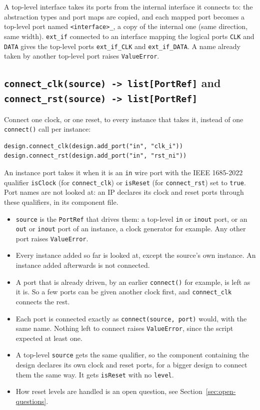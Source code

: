 \documentclass[11pt]{article}
\newcommand{\code}[1]{\texttt{#1}}
\begin{document}
A top-level interface takes its ports from the internal interface it connects to: the
abstraction types and port maps are copied, and each mapped port becomes a top-level port
named \code{<interface>\_<logical port>}, a copy of the internal one (same direction, same
width). \code{ext\_if} connected to an interface mapping the logical ports \code{CLK} and
\code{DATA} gives the top-level ports \code{ext\_if\_CLK} and \code{ext\_if\_DATA}. A name
already taken by another top-level port raises \code{ValueError}.

\subsection{\texttt{connect\_clk(source) -> list[PortRef]} and \texttt{connect\_rst(source) -> list[PortRef]}}

Connect one clock, or one reset, to every instance that takes it, instead of one
\code{connect()} call per instance:

\begin{lstlisting}[style=pyblock]
design.connect_clk(design.add_port("in", "clk_i"))
design.connect_rst(design.add_port("in", "rst_ni"))
\end{lstlisting}

An instance port takes it when it is an \code{in} wire port with the IEEE 1685-2022
qualifier \code{isClock} (for \code{connect\_clk}) or \code{isReset} (for
\code{connect\_rst}) set to \code{true}. Port names are not looked at: an IP declares its
clock and reset ports through these qualifiers, in its component file.

\begin{itemize}
    \item \code{source} is the \code{PortRef} that drives them: a top-level \code{in} or
    \code{inout} port, or an \code{out} or \code{inout} port of an instance, a clock
    generator for example. Any other port raises \code{ValueError}.
    \item Every instance added so far is looked at, except the source's own instance. An
    instance added afterwards is not connected.
    \item A port that is already driven, by an earlier \code{connect()} for example, is
    left as it is. So a few ports can be given another clock first, and
    \code{connect\_clk} connects the rest.
    \item Each port is connected exactly as \code{connect(source, port)} would, with the
    same name. Nothing left to connect raises \code{ValueError}, since the script
    expected at least one.
    \item A top-level \code{source} gets the same qualifier, so the component containing
    the design declares its own clock and reset ports, for a bigger design to connect
    them the same way. It gets \code{isReset} with no \code{level}.
    \item How reset levels are handled is an open question, see
    Section~\ref{sec:open-questions}.
\end{itemize}
\end{document}
